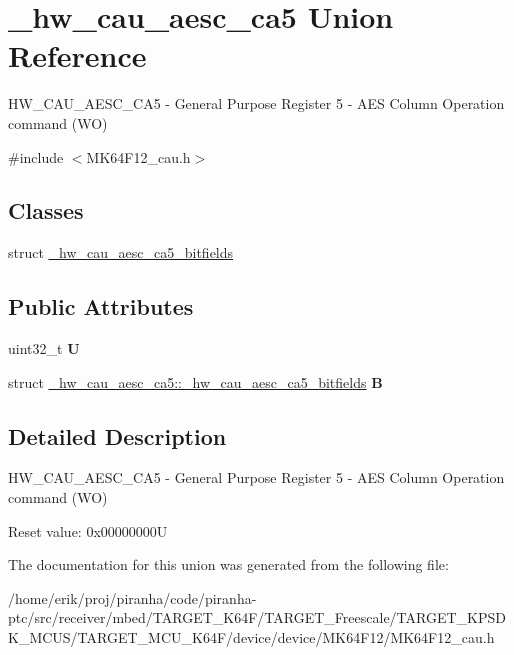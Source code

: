 \hypertarget{union__hw__cau__aesc__ca5}{}\section{\+\_\+hw\+\_\+cau\+\_\+aesc\+\_\+ca5 Union Reference}
\label{union__hw__cau__aesc__ca5}


H\+W\+\_\+\+C\+A\+U\+\_\+\+A\+E\+S\+C\+\_\+\+C\+A5 -\/ General Purpose Register 5 -\/ A\+ES Column Operation command (WO)  




{\ttfamily \#include $<$M\+K64\+F12\+\_\+cau.\+h$>$}

\subsection*{Classes}
\begin{DoxyCompactItemize}
\item 
struct \hyperlink{struct__hw__cau__aesc__ca5_1_1__hw__cau__aesc__ca5__bitfields}{\+\_\+hw\+\_\+cau\+\_\+aesc\+\_\+ca5\+\_\+bitfields}
\end{DoxyCompactItemize}
\subsection*{Public Attributes}
\begin{DoxyCompactItemize}
\item 
uint32\+\_\+t {\bfseries U}\hypertarget{union__hw__cau__aesc__ca5_a9c439a7c4594cb4d0cc809f4419cd60f}{}\label{union__hw__cau__aesc__ca5_a9c439a7c4594cb4d0cc809f4419cd60f}

\item 
struct \hyperlink{struct__hw__cau__aesc__ca5_1_1__hw__cau__aesc__ca5__bitfields}{\+\_\+hw\+\_\+cau\+\_\+aesc\+\_\+ca5\+::\+\_\+hw\+\_\+cau\+\_\+aesc\+\_\+ca5\+\_\+bitfields} {\bfseries B}\hypertarget{union__hw__cau__aesc__ca5_a0224d076137de56f4d42c76ad5e753fb}{}\label{union__hw__cau__aesc__ca5_a0224d076137de56f4d42c76ad5e753fb}

\end{DoxyCompactItemize}


\subsection{Detailed Description}
H\+W\+\_\+\+C\+A\+U\+\_\+\+A\+E\+S\+C\+\_\+\+C\+A5 -\/ General Purpose Register 5 -\/ A\+ES Column Operation command (WO) 

Reset value\+: 0x00000000U 

The documentation for this union was generated from the following file\+:\begin{DoxyCompactItemize}
\item 
/home/erik/proj/piranha/code/piranha-\/ptc/src/receiver/mbed/\+T\+A\+R\+G\+E\+T\+\_\+\+K64\+F/\+T\+A\+R\+G\+E\+T\+\_\+\+Freescale/\+T\+A\+R\+G\+E\+T\+\_\+\+K\+P\+S\+D\+K\+\_\+\+M\+C\+U\+S/\+T\+A\+R\+G\+E\+T\+\_\+\+M\+C\+U\+\_\+\+K64\+F/device/device/\+M\+K64\+F12/M\+K64\+F12\+\_\+cau.\+h\end{DoxyCompactItemize}
